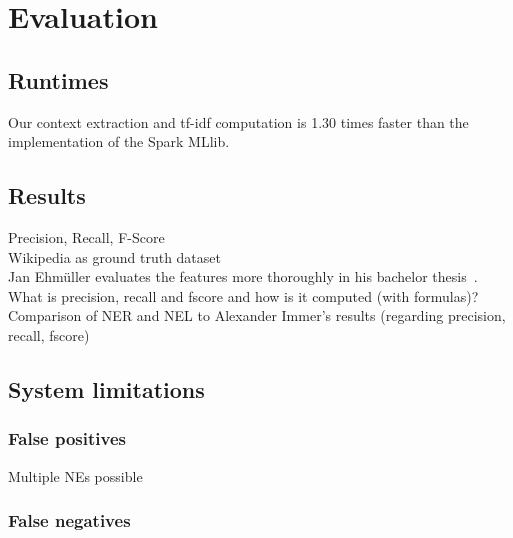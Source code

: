 \section{Evaluation}
\label{sec:evaluation}
\subsection{Runtimes}
Our context extraction and tf-idf computation is 1.30 times faster than the implementation of the Spark MLlib.\\

\subsection{Results}
Precision, Recall, F-Score\\
Wikipedia as ground truth dataset\\
Jan Ehmüller evaluates the features more thoroughly in his bachelor thesis~\cite{Jan}.\\
What is precision, recall and fscore and how is it computed (with formulas)?
Comparison of NER and NEL to Alexander Immer's results (regarding precision, recall, fscore)

\subsection{System limitations}
\subsubsection{False positives}
Multiple NEs possible
\subsubsection{False negatives}